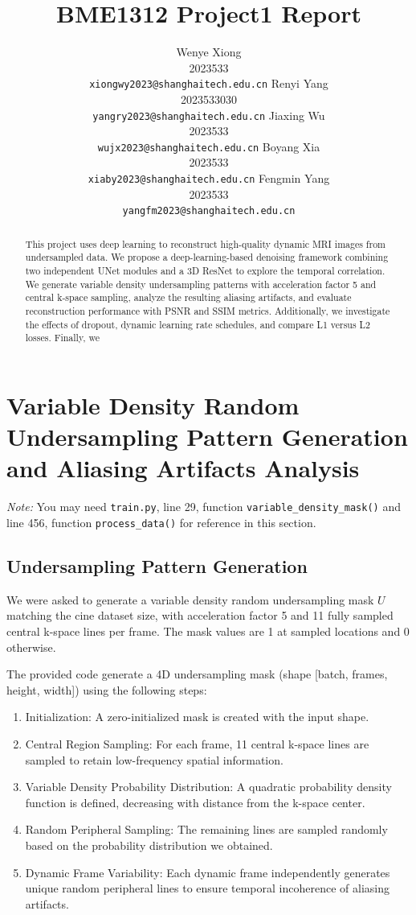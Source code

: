 \documentclass{article}
\title{BME1312 Project1 Report}
\author{%
  Wenye Xiong \\
  2023533 \\
  \texttt{xiongwy2023@shanghaitech.edu.cn}
  \And
  Renyi Yang \\
  2023533030 \\
  \texttt{yangry2023@shanghaitech.edu.cn}
  \AND
  Jiaxing Wu \\
  2023533 \\
  \texttt{wujx2023@shanghaitech.edu.cn}
  \And
  Boyang Xia \\
  2023533 \\
  \texttt{xiaby2023@shanghaitech.edu.cn}
  \AND
  Fengmin Yang \\
  2023533 \\
  \texttt{yangfm2023@shanghaitech.edu.cn}
}
\begin{document}
\maketitle


\begin{abstract}
  This project uses deep learning to reconstruct high-quality dynamic MRI images
  from undersampled data. We propose a deep-learning-based denoising framework combining
  two independent UNet modules and a 3D ResNet to explore the temporal correlation.
  We generate variable density undersampling patterns with acceleration factor 5 and
  central k-space sampling, analyze the resulting aliasing artifacts, and evaluate
  reconstruction performance with PSNR and SSIM metrics. Additionally,
  we investigate the effects of dropout, dynamic learning rate schedules,
  and compare L1 versus L2 losses. Finally, we %
\end{abstract}

\section{Variable Density Random Undersampling Pattern Generation and Aliasing Artifacts Analysis}
\textit{Note: }You may need \texttt{train.py}, line 29, function \texttt{variable\_density\_mask()}
and line 456, function \texttt{process\_data()} for reference in this section.

\subsection{Undersampling Pattern Generation}
We were asked to generate a variable density random undersampling mask $U$ matching the cine
dataset size, with acceleration factor 5 and 11 fully sampled central k-space lines per frame.
The mask values are 1 at sampled locations and 0 otherwise.

The provided code generate a 4D undersampling mask (shape [batch, frames, height, width]) using the following steps:
\begin{enumerate}
  \item Initialization: A zero-initialized mask is created with the input shape.
  \item Central Region Sampling: For each frame, 11 central k-space lines are
        sampled to retain low-frequency spatial information.
  \item Variable Density Probability Distribution: A quadratic probability density
        function is defined, decreasing with distance from the k-space center.
  \item Random Peripheral Sampling: The remaining lines are sampled randomly
        based on the probability distribution we obtained.
  \item Dynamic Frame Variability: Each dynamic frame independently generates
        unique random peripheral lines to ensure temporal incoherence of aliasing artifacts.
\end{enumerate}
\end{document}
